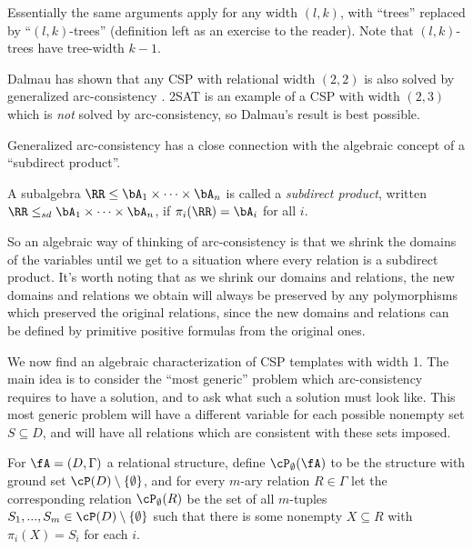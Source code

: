 \begin{rem} Essentially the same arguments apply for any width $(l,k)$, with ``trees'' replaced by ``$(l,k)$-trees'' (definition left as an exercise to the reader). Note that $(l,k)$-trees have tree-width $k-1$. 
\end{rem}

\begin{rem} Dalmau has shown that any CSP with relational width $(2,2)$ is also solved by generalized arc-consistency \cite{no-pure-width-2}. 2SAT is an example of a CSP with width $(2,3)$ which is \emph{not} solved by arc-consistency, so Dalmau's result is best possible.
\end{rem}

Generalized arc-consistency has a close connection with the algebraic concept of a ``subdirect product''.

\begin{defn} A subalgebra $\RR\le \bA_1\times \cdots \times \bA_n$ is called a \emph{subdirect product}, written $\RR \le_{sd} \bA_1\times \cdots \times \bA_n$, if $\pi_i(\RR) = \bA_i$ for all $i$.
\end{defn}

So an algebraic way of thinking of arc-consistency is that we shrink the domains of the variables until we get to a situation where every relation is a subdirect product. It's worth noting that as we shrink our domains and relations, the new domains and relations we obtain will always be preserved by any polymorphisms which preserved the original relations, since the new domains and relations can be defined by primitive positive formulas from the original ones.

We now find an algebraic characterization of CSP templates with width 1. The main idea is to consider the ``most generic'' problem which arc-consistency requires to have a solution, and to ask what such a solution must look like. This most generic problem will have a different variable for each possible nonempty set $S \subseteq D$, and will have all relations which are consistent with these sets imposed.

\begin{defn} For $\fA = (D, \Gamma)$ a relational structure, define $\cP_\emptyset(\fA)$ to be the structure with ground set $\cP(D)\setminus \{\emptyset\}$, and for every $m$-ary relation $R \in \Gamma$ let the corresponding relation $\cP_\emptyset(R)$ be the set of all $m$-tuples $S_1, ..., S_m \in \cP(D)\setminus \{\emptyset\}$ such that there is some nonempty $X \subseteq R$ with $\pi_i(X) = S_i$ for each $i$.
\end{defn}

